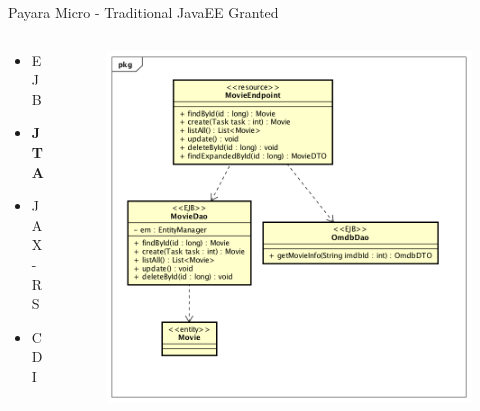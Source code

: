 \documentclass{beamer}
\begin{document}
\begin{frame}{Payara Micro - Traditional JavaEE}
Granted
\begin{columns}[T] %
	\begin{column}[T]{3cm} %
		\begin{itemize}
			\item EJB
			\item \textbf{JTA}
			\item JAX-RS
			\item CDI
		\end{itemize}
	\end{column}
	\begin{column}[T]{7cm} %
\begin{figure}
	\centering
	\includegraphics[width=\linewidth]{Images/democlass}
\end{figure}
	\end{column}
\end{columns}
\end{frame}
\end{document}
